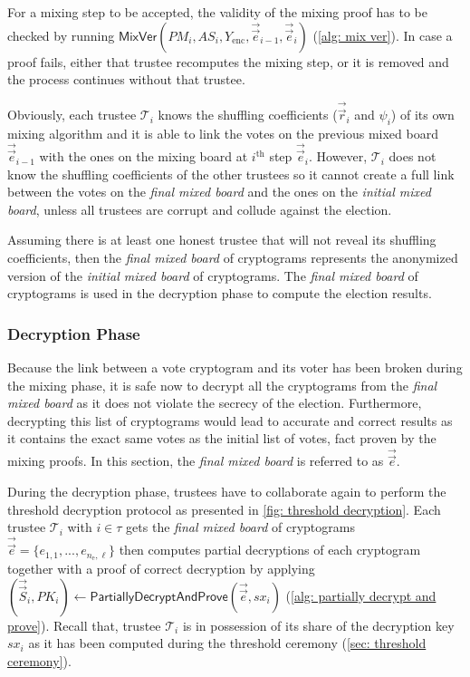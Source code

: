 For a mixing step to be accepted, the validity of the mixing proof has to be checked by running $\mathsf{MixVer}(PM_i, AS_i, Y_\mathrm{enc}, \vec{\vec{e}}_{i-1}, \vec{\vec{e}}_i)$ (\cref{alg: mix ver}). In case a proof fails, either that trustee recomputes the mixing step, or it is removed and the process continues without that trustee.

Obviously, each trustee $\mathcal{T}_i$ knows the shuffling coefficients ($\vec{\vec{r}}_i$ and $\psi_i$) of its own mixing algorithm and it is able to link the votes on the previous mixed board $\vec{\vec{e}}_{i-1}$ with the ones on the mixing board at $i^\mathrm{th}$ step $\vec{\vec{e}}_i$. However, $\mathcal{T}_i$ does not know the shuffling coefficients of the other trustees so it cannot create a full link between the votes on the \textit{final mixed board} and the ones on the \textit{initial mixed board}, unless all trustees are corrupt and collude against the election.

Assuming there is at least one honest trustee that will not reveal its shuffling coefficients, then the \textit{final mixed board} of cryptograms represents the anonymized version of the \textit{initial mixed board} of cryptograms. The \textit{final mixed board} of cryptograms is used in the decryption phase to compute the election results.


\subsubsection{Decryption Phase} \label{sec: decryption phase}
Because the link between a vote cryptogram and its voter has been broken during the mixing phase, it is safe now to decrypt all the cryptograms from the \textit{final mixed board} as it does not violate the secrecy of the election. Furthermore, decrypting this list of cryptograms would lead to accurate and correct results as it contains the exact same votes as the initial list of votes, fact proven by the mixing proofs. In this section, the \textit{final mixed board} is referred to as $\vec{\vec{e}}$.

During the decryption phase, trustees have to collaborate again to perform the threshold decryption protocol as presented in \cref{fig: threshold decryption}. Each trustee $\mathcal{T}_i$ with $i \in \tau$ gets the \textit{final mixed board} of cryptograms $\vec{\vec{e}} = \{ e_{1, 1}, ..., e_{n_\mathrm{e}, \ell} \}$ then computes partial decryptions of each cryptogram together with a proof of correct decryption by applying $(\vec{\vec{S}}_i, PK_i) \gets \mathsf{PartiallyDecryptAndProve}(\vec{\vec{e}}, sx_i)$ (\cref{alg: partially decrypt and prove}). Recall that, trustee $\mathcal{T}_i$ is in possession of its share of the decryption key $sx_i$ as it has been computed during the threshold ceremony (\cref{sec: threshold ceremony}).

